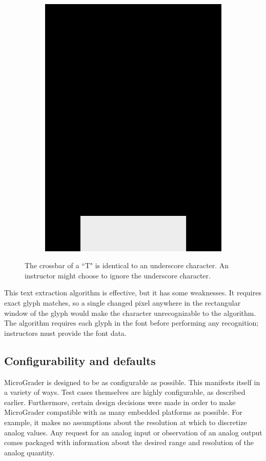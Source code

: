 \documentclass[12pt]{article}
\begin{document}
\begin{figure}
\begin{subfigure}[b]{.3\linewidth}
\includegraphics[width=\linewidth]{glyph-underscore.png}
\label{fig:glyph-underscore}
\end{subfigure}
\caption{The crossbar of a ``T" is identical to an underscore character.  An instructor might choose to ignore the underscore character.}
\label{fig:bad-ocr}
\end{figure}

This text extraction algorithm is effective, but it has some weaknesses.  It requires exact glyph matches, so a single changed pixel anywhere in the rectangular window of the glyph would make the character unrecognizable to the algorithm.  The algorithm requires each glyph in the font before performing any recognition; instructors must provide the font data.

\subsection{Configurability and defaults}
\label{sec:config}
MicroGrader is designed to be as configurable as possible.  This manifests itself in a variety of ways.  Test cases themselves are highly configurable, as described earlier.  Furthermore, certain design decisions were made in order to make MicroGrader compatible with as many embedded platforms as possible.  For example, it makes no assumptions about the resolution at which to discretize analog values.  Any request for an analog input or observation of an analog output comes packaged with information about the desired range and resolution of the analog quantity.
\end{document}
